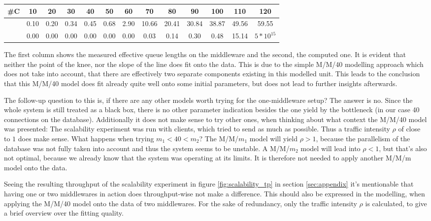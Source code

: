 \documentclass[11pt]{article}
\begin{document}
\begin{center}
	\begin{tabular}{c|cccccccccccc}
		\#C & 10 & 20& 30 & 40 & 50 & 60 & 70 & 80 & 90 & 100 & 110 & 120\\\hline
		 & 0.10 & 0.20 & 0.34 & 0.45 & 0.68 & 2.90 & 10.66 & 20.41 & 30.84 & 38.87 & 49.56 & 59.55 \\
		 & 0.00 & 0.00 & 0.00 & 0.00 & 0.00 & 0.00 & 0.03 & 0.14 & 0.30 & 0.48 & 15.14 & $5*10^{15}$\\
	\end{tabular}
\end{center}

The first column shows the measured effective queue lengths on the middleware and the second, the computed one. It is evident that neither the point of the knee, nor the slope of the line does fit onto the data. This is due to the simple M/M/40 modelling approach which does not take into account, that there are effectively two separate components existing in this modelled unit. This leads to the conclusion that this M/M/40 model does fit already quite well onto some initial parameters, but does not lead to further insights afterwards.

The follow-up question to this is, if there are any other models worth trying for the one-middleware setup? The answer is no. Since the whole system is still treated as a black box, there is no other parameter indication besides the one yield by the bottleneck (in our case 40 connections on the database). Additionally it does not make sense to try other ones, when thinking about what context the M/M/40 model was presented: The scalability experiment was run with clients, which tried to send as much as possible. Thus a traffic intensity $\rho$ of close to $1$ does make sense. What happens when trying $m_1<40<m_2$? The M/M/$m_1$ model will yield $\rho>1$, because the parallelism of the database was not fully taken into account and thus the system seems to be unstable. A M/M/$m_2$ model will lead into $\rho<1$, but that's also not optimal, because we already know that the system was operating at its limits. It is therefore not needed to apply another M/M/m model onto the data.

Seeing the resulting throughput of the scalability experiment in figure \ref{fig:scalability_tp} in section \ref{sec:appendix} it's mentionable that having one or two middlewares in action does throughput-wise not make a difference. This should also be expressed in the modelling, when applying the M/M/40 model onto the data of two middlewares. For the sake of redundancy, only the traffic intensity $\rho$ is calculated, to give a brief overview over the fitting quality.
\end{document}
